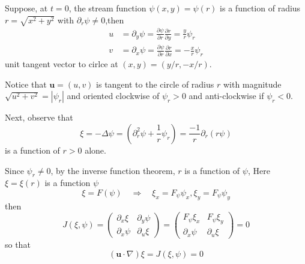 Suppose, at $t=0$, the stream function $\psi(x,y) = \psi(r)$ is a function of radius $r=\sqrt{x^2+y^2}$ with $\partial_r \psi\neq 0$,then
\begin{equation}
\begin{aligned}
u &= \partial_y \psi = \frac{\partial \psi}{\partial r} \frac{\partial r}{\partial y} = \frac{y}{r}\psi_{r}\\
v &= \partial_x \psi = \frac{\partial \psi}{\partial r} \frac{\partial r}{\partial x} = -\frac{x}{r}\psi_{r}
\end{aligned}
\end{equation}
unit tangent vector to cirlce at $(x,y) = (y/r, -x/r)$.

Notice that $\textbf{u}=(u,v)$ is tangent to the circle of radius $r$ with magnitude $\sqrt{u^2+v^2} = |\psi_r|$ and oriented clockwise of $\psi_r>0$ and anti-clockwise if $\psi_r < 0$.

Next, observe that 
\begin{equation}
\xi = -\Delta \psi = \left(\partial^2_{r} \psi + \frac{1}{r}\psi_{r}\right) = \frac{-1}{r}\partial_{r}(r\psi)
\end{equation}
is a function of $r>0$ alone.

Since $\psi_r\neq 0$, by the inverse function theorem, $r$ is a function of $\psi$, Here $\xi = \xi(r)$ is a function $\psi$ 
\begin{equation}
\xi = F(\psi)
\quad\Rightarrow\quad
\xi_{x} = F_{\psi}\psi_{x}, \xi_{y} = F_{\psi}\psi_{y}
\end{equation}
then
\begin{equation}
J(\xi,\psi) = \begin{pmatrix}\partial_x\xi & \partial_y \psi\\ \partial_x \psi & \partial_u \xi\end{pmatrix} =
\begin{pmatrix}
F_{\psi}\xi_x & F_{\psi}\xi_y\\
\partial_x \psi & \partial_u \xi
\end{pmatrix} = 0
\end{equation}
so that 
\begin{equation}
(\textbf{u}\cdot\nabla)\xi = J(\xi,\psi) = 0
\end{equation}


